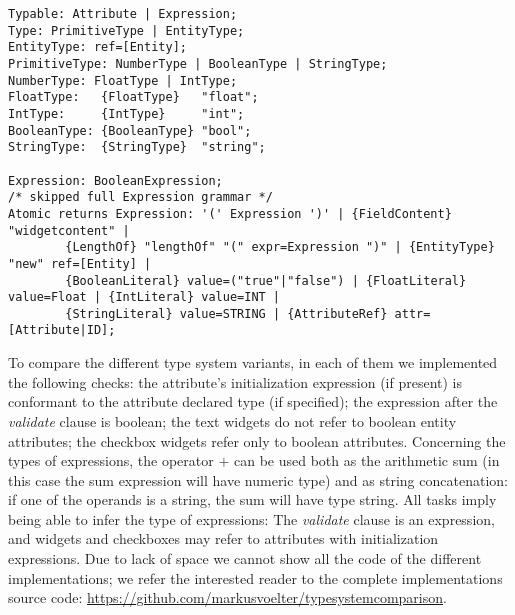 \begin{lstlisting}[language=xtext,float,label=lst:grammar-plain-types-and-ex,caption=Types
and Expressions.] 
Typable: Attribute | Expression;
Type: PrimitiveType | EntityType;
EntityType: ref=[Entity];
PrimitiveType: NumberType | BooleanType | StringType;
NumberType: FloatType | IntType;
FloatType:   {FloatType}   "float";
IntType:     {IntType}     "int";
BooleanType: {BooleanType} "bool";
StringType:	 {StringType}  "string";

Expression: BooleanExpression;
/* skipped full Expression grammar */
Atomic returns Expression: '(' Expression ')' | {FieldContent} "widgetcontent" |
		{LengthOf} "lengthOf" "(" expr=Expression ")" | {EntityType} "new" ref=[Entity] | 
		{BooleanLiteral} value=("true"|"false") | {FloatLiteral} value=Float | {IntLiteral} value=INT |
		{StringLiteral} value=STRING | {AttributeRef} attr=[Attribute|ID];
\end{lstlisting}

%




To compare the different type system variants, in each of them we implemented
the following checks: the attribute's initialization expression (if present)
is conformant to the attribute declared type (if specified); the expression
after the \emph{validate} clause is boolean; the text widgets do not refer to
boolean entity attributes; the checkbox widgets refer only to boolean
attributes.
Concerning the types of expressions, the operator $+$ can be used both as the
arithmetic sum (in this case the sum expression will have numeric type) and as
string concatenation: if one of the operands is a string, the sum will have type
string.  All tasks imply being able to infer the type of expressions:
The \emph{validate} clause is an expression, and widgets and checkboxes may refer to attributes with
initialization expressions.  Due to lack of space we cannot show all the code of
the different implementations; we refer the interested reader to the complete
implementations source code:
\url{https://github.com/markusvoelter/typesystemcomparison}.
